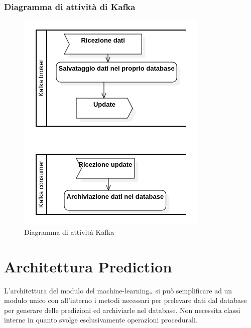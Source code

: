 \subsubsection{Diagramma di attività di Kafka}\label{DiagrammaDiKafka}
\begin{center}
	\begin{figure}[H]
		\centering\includegraphics[scale=0.8]
    {../immagini/diag_PB/kafka.png}
		\caption{Diagramma di attività Kafka}
	\end{figure}
\end{center}


\section{Architettura Prediction}\label{ArchitetturaDelProdottoPrediction}
L'architettura del modulo del machine-learning$_{\scaleto{G}{3pt}}$ si può semplificare ad un modulo unico con all'interno i metodi necessari per prelevare dati dal database per generare delle predizioni ed archiviarle nel database.
Non necessita classi interne in quanto svolge esclusivamente operazioni procedurali. 
